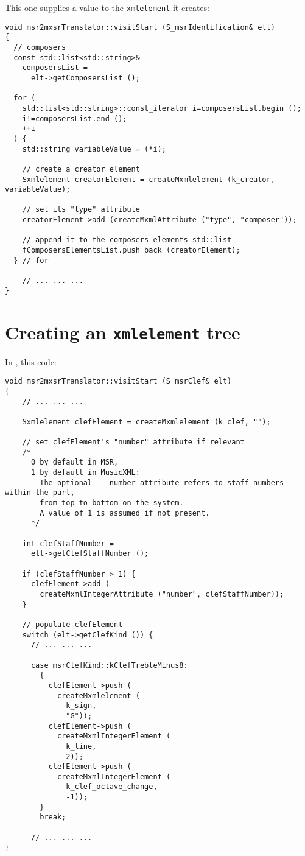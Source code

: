 This one supplies a value to the {\tt xmlelement} it creates:
\begin{lstlisting}[language=CPlusPlus]
void msr2mxsrTranslator::visitStart (S_msrIdentification& elt)
{
  // composers
  const std::list<std::string>&
    composersList =
      elt->getComposersList ();

  for (
    std::list<std::string>::const_iterator i=composersList.begin ();
    i!=composersList.end ();
    ++i
  ) {
    std::string variableValue = (*i);

    // create a creator element
    Sxmlelement creatorElement = createMxmlelement (k_creator, variableValue);

    // set its "type" attribute
    creatorElement->add (createMxmlAttribute ("type", "composer"));

    // append it to the composers elements std::list
    fComposersElementsList.push_back (creatorElement);
  } // for

	// ... ... ...
}
\end{lstlisting}


\section{Creating an {\tt xmlelement} tree}

In {\tt }, this code:
\begin{lstlisting}[language=CPlusPlus]
void msr2mxsrTranslator::visitStart (S_msrClef& elt)
{
    // ... ... ...

    Sxmlelement clefElement = createMxmlelement (k_clef, "");

    // set clefElement's "number" attribute if relevant
    /*
      0 by default in MSR,
      1 by default in MusicXML:
        The optional	number attribute refers to staff numbers within the part,
        from top to bottom on the system.
        A value of 1 is assumed if not present.
	  */

    int clefStaffNumber =
      elt->getClefStaffNumber ();

    if (clefStaffNumber > 1) {
      clefElement->add (
        createMxmlIntegerAttribute ("number", clefStaffNumber));
    }

    // populate clefElement
    switch (elt->getClefKind ()) {
      // ... ... ...

      case msrClefKind::kClefTrebleMinus8:
        {
          clefElement->push (
            createMxmlelement (
              k_sign,
              "G"));
          clefElement->push (
            createMxmlIntegerElement (
              k_line,
              2));
          clefElement->push (
            createMxmlIntegerElement (
              k_clef_octave_change,
              -1));
        }
        break;

      // ... ... ...
}
\end{lstlisting}


